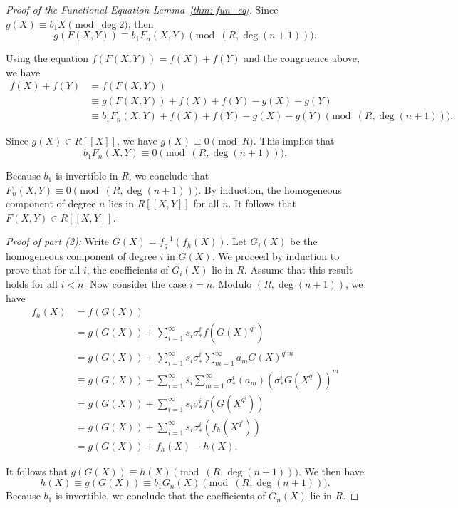 \begin{proof}[Proof of the Functional Equation Lemma~\ref{thm: fun_eq}]
Since $g(X) \equiv b_1 X \pmod{\deg 2}$, then
\[g (F(X, Y)) \equiv b_1F_n (X, Y) \pmod{(R, \deg (n + 1))}. \]

Using the equation $f(F(X,Y)) = f (X) + f (Y)$ and the congruence above, we have
\begin{align*}
    f(X) + f(Y) &= f(F(X,Y)) \\
        &\equiv g(F(X,Y)) + f(X) + f(Y) - g(X) - g(Y)\\
        &\equiv b_1 F_n(X,Y) + f(X) + f(Y) - g(X) - g(Y) \pmod{(R, \deg (n + 1))}.
\end{align*}

Since $g(X) \in R[\![X]\!]$, we have $g(X) \equiv 0 \pmod{R}$. This implies that
\[b_1 F_n(X, Y) \equiv 0 \pmod{(R, \deg(n + 1))}. \]

Because $b_1$ is invertible in $R$, we conclude that $F_n(X, Y) \equiv 0 \pmod{(R, \deg(n + 1))}$.
By induction, the homogeneous component of degree $n$ lies in $R[\![X, Y]\!]$ for all $n$.
It follows that $F(X, Y) \in R[\![X, Y]\!]$.

\textit{Proof of part (2):} Write $G(X) = f_g^{-1}(f_{h}(X))$. Let $G_i(X)$ be the homogeneous component of degree $i$ in $G(X)$. We proceed by induction to prove that for all $i$, the coefficients of $G_i(X)$ lie in $R$. Assume that this result holds for all $i < n$. Now consider the case $i = n$. Modulo $(R, \deg(n + 1))$, we have
\[ \begin{aligned}
    f_{h}(X) &= f(G(X)) \\
    &= g(G(X)) + \sum_{i = 1}^\infty s_i \sigma_*^i f(G(X)^{q^i}) \\
    &= g(G(X)) + \sum_{i = 1}^\infty s_i \sigma_*^i \sum_{m = 1}^\infty a_m G(X)^{q^i m} \\
    &\equiv g(G(X)) + \sum_{i = 1}^\infty s_i \sum_{m = 1}^\infty \sigma_*^i(a_m) (\sigma_*^i G(X^{q^i}))^m \\
    &= g(G(X)) + \sum_{i = 1}^\infty s_i \sigma_*^i f(G(X^{q^i})) \\
    &= g(G(X)) + \sum_{i = 1}^\infty s_i \sigma_*^i (f_{h}(X^{q^i})) \\
    &= g(G(X)) + f_{h}(X) - h(X).
\end{aligned} \]

It follows that $g(G(X)) \equiv h(X) \pmod{(R, \deg(n + 1))}$. We then have
\[h(X) \equiv g(G(X)) \equiv b_1 G_n(X) \pmod{(R, \deg(n + 1))}.\]
Because $b_1$ is invertible, we conclude that the coefficients of $G_n(X)$ lie in $R$.


\end{proof}
